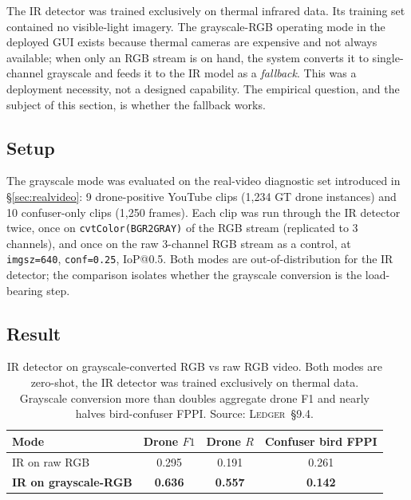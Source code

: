 \documentclass[12pt,a4paper,oneside,openright]{book}
\begin{document}
The IR detector was trained exclusively on thermal infrared data. Its training set contained no visible-light imagery. The grayscale-RGB operating mode in the deployed GUI exists because thermal cameras are expensive and not always available; when only an RGB stream is on hand, the system converts it to single-channel grayscale and feeds it to the IR model as a \emph{fallback}. This was a deployment necessity, not a designed capability. The empirical question, and the subject of this section, is whether the fallback works.

\subsection{Setup}

The grayscale mode was evaluated on the real-video diagnostic set introduced in \S\ref{sec:realvideo}: 9 drone-positive YouTube clips (1{,}234 GT drone instances) and 10 confuser-only clips (1{,}250 frames). Each clip was run through the IR detector twice, once on \texttt{cvtColor(BGR2GRAY)} of the RGB stream (replicated to 3 channels), and once on the raw 3-channel RGB stream as a control, at \texttt{imgsz=640}, \texttt{conf=0.25}, IoP@0.5. Both modes are out-of-distribution for the IR detector; the comparison isolates whether the grayscale conversion is the load-bearing step.

\subsection{Result}

\begin{table}[htbp]
    \centering
    \caption{IR detector on grayscale-converted RGB vs raw RGB video. Both modes are zero-shot, the IR detector was trained exclusively on thermal data. Grayscale conversion more than doubles aggregate drone F1 and nearly halves bird-confuser FPPI. Source: \textsc{Ledger}~\S9.4.}
    \label{tab:ir_grayscale}
    \begin{tabular}{lccc}
        \toprule
        Mode & Drone $F1$ & Drone $R$ & Confuser bird FPPI \\
        \midrule
        IR on raw RGB             & 0.295 & 0.191 & 0.261 \\
        \textbf{IR on grayscale-RGB} & \textbf{0.636} & \textbf{0.557} & \textbf{0.142} \\
        \bottomrule
    \end{tabular}
\end{table}
\end{document}

